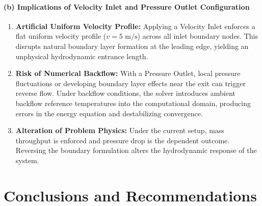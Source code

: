 \documentclass[12pt,a4paper]{report}
\begin{document}
\subsubsection{(b) Implications of Velocity Inlet and Pressure Outlet Configuration}
\begin{enumerate}
    \item \textbf{Artificial Uniform Velocity Profile:} Applying a Velocity Inlet enforces a flat uniform velocity profile ($v = 5\text{ m/s}$) across all inlet boundary nodes. This disrupts natural boundary layer formation at the leading edge, yielding an unphysical hydrodynamic entrance length.
    \item \textbf{Risk of Numerical Backflow:} With a Pressure Outlet, local pressure fluctuations or developing boundary layer effects near the exit can trigger reverse flow. Under backflow conditions, the solver introduces ambient backflow reference temperatures into the computational domain, producing errors in the energy equation and destabilizing convergence.
    \item \textbf{Alteration of Problem Physics:} Under the current setup, mass throughput is enforced and pressure drop is the dependent outcome. Reversing the boundary formulation alters the hydrodynamic response of the system.
\end{enumerate}


\chapter{Conclusions and Recommendations}
\end{document}
